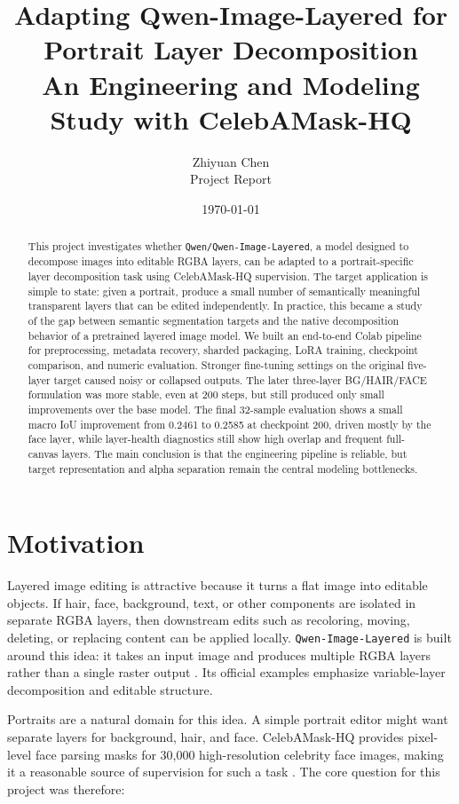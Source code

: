 \documentclass[11pt]{article}
\title{\textbf{Adapting Qwen-Image-Layered for Portrait Layer Decomposition}\\
\large An Engineering and Modeling Study with CelebAMask-HQ}
\author{Zhiyuan Chen\\Project Report}
\date{\today}
\begin{document}
\maketitle

\begin{abstract}
This project investigates whether \texttt{Qwen/Qwen-Image-Layered}, a model
designed to decompose images into editable RGBA layers, can be adapted to a
portrait-specific layer decomposition task using CelebAMask-HQ supervision. The
target application is simple to state: given a portrait, produce a small number
of semantically meaningful transparent layers that can be edited independently.
In practice, this became a study of the gap between semantic segmentation targets
and the native decomposition behavior of a pretrained layered image model. We
built an end-to-end Colab pipeline for preprocessing, metadata recovery, sharded
packaging, LoRA training, checkpoint comparison, and numeric evaluation. Stronger
fine-tuning settings on the original five-layer target caused noisy or collapsed
outputs. The later three-layer BG/HAIR/FACE formulation was more stable, even at
200 steps, but still produced only small improvements over the base model. The
final 32-sample evaluation shows a small macro IoU improvement from 0.2461 to
0.2585 at checkpoint 200, driven mostly by the face layer, while layer-health
diagnostics still show high overlap and frequent full-canvas layers. The main
conclusion is that the engineering pipeline is reliable, but target representation
and alpha separation remain the central modeling bottlenecks.
\end{abstract}

\section{Motivation}

Layered image editing is attractive because it turns a flat image into editable
objects. If hair, face, background, text, or other components are isolated in
separate RGBA layers, then downstream edits such as recoloring, moving, deleting,
or replacing content can be applied locally. \texttt{Qwen-Image-Layered} is built
around this idea: it takes an input image and produces multiple RGBA layers rather
than a single raster output \cite{qwenlayered}. Its official examples emphasize
variable-layer decomposition and editable structure.

Portraits are a natural domain for this idea. A simple portrait editor might want
separate layers for background, hair, and face. CelebAMask-HQ provides pixel-level
face parsing masks for 30,000 high-resolution celebrity face images, making it a
reasonable source of supervision for such a task \cite{celebamaskhq}. The core
question for this project was therefore:
\end{document}
